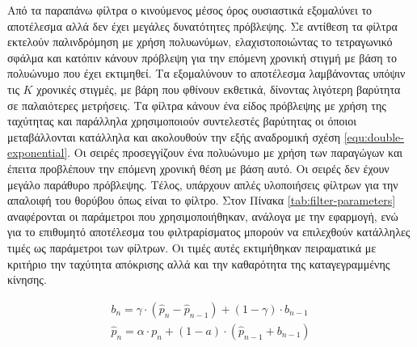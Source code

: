Από τα παραπάνω φίλτρα ο κινούμενος μέσος όρος ουσιαστικά εξομαλύνει το αποτέλεσμα αλλά δεν έχει μεγάλες δυνατότητες πρόβλεψης. Σε αντίθεση τα φίλτρα  εκτελούν παλινδρόμηση με χρήση πολυωνύμων, ελαχιστοποιώντας το τετραγωνικό σφάλμα και κατόπιν κάνουν πρόβλεψη για την επόμενη χρονική στιγμή με βάση το πολυώνυμο που έχει εκτιμηθεί. Τα  εξομαλύνουν το αποτέλεσμα λαμβάνοντας υπόψιν τις $Κ$ χρονικές στιγμές, με βάρη που φθίνουν εκθετικά, δίνοντας λιγότερη βαρύτητα σε παλαιότερες μετρήσεις. Τα  φίλτρα κάνουν ένα είδος πρόβλεψης με χρήση της ταχύτητας και παράλληλα χρησιμοποιούν συντελεστές βαρύτητας οι όποιοι μεταβάλλονται κατάλληλα και ακολουθούν την εξής αναδρομική σχέση \ref{equ:double-exponential}. Οι σειρές  προσεγγίζουν ένα πολυώνυμο με χρήση των παραγώγων και έπειτα προβλέπουν την επόμενη χρονική θέση με βάση αυτό. Οι σειρές  δεν έχουν μεγάλο παράθυρο πρόβλεψης. Τέλος, υπάρχουν απλές υλοποιήσεις φίλτρων για την απαλοιφή του θορύβου όπως είναι το  φίλτρο. Στον Πίνακα \ref{tab:filter-parameters} αναφέρονται οι παράμετροι που χρησιμοποιήθηκαν, ανάλογα με την εφαρμογή, ενώ για το επιθυμητό αποτέλεσμα του φιλτραρίσματος μπορούν να επιλεχθούν κατάλληλες τιμές ως παράμετροι των φίλτρων. Οι τιμές αυτές εκτιμήθηκαν πειραματικά με κριτήριο την ταχύτητα απόκρισης αλλά και την καθαρότητα της καταγεγραμμένης κίνησης.

\begin{equation}
    \begin{aligned}
        b_{n} = \gamma \cdot (\hat{p}_{n} - \hat{p}_{n-1}) + (1 - \gamma) \cdot b_{n-1}\\[10pt]
        \hat{p}_{n} = \alpha \cdot p_{n} + (1 - a) \cdot (\hat{p}_{n-1} + b_{n-1})
    \end{aligned}
    \label{equ:double-exponential}
\end{equation}

\vspace{10pt}

